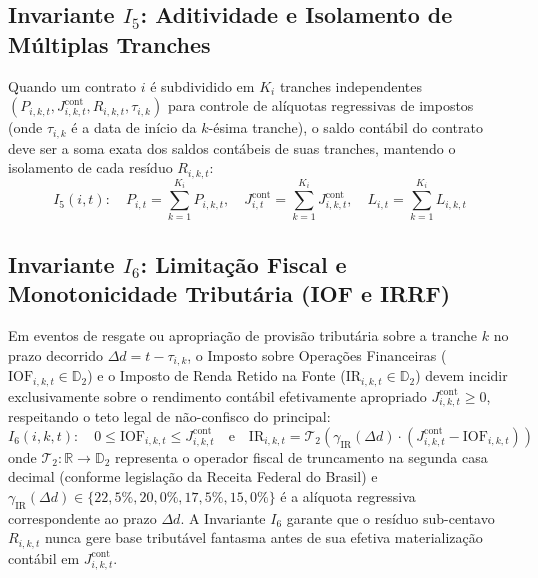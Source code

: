 \documentclass[11pt, a4paper]{article}
\begin{document}
\subsection{Invariante $I_5$: Aditividade e Isolamento de Múltiplas Tranches}

Quando um contrato $i$ é subdividido em $K_i$ tranches independentes $(P_{i,k,t}, J_{i,k,t}^{\text{cont}}, R_{i,k,t}, \tau_{i,k})$ para controle de alíquotas regressivas de impostos (onde $\tau_{i,k}$ é a data de início da $k$-ésima tranche), o saldo contábil do contrato deve ser a soma exata dos saldos contábeis de suas tranches, mantendo o isolamento de cada resíduo $R_{i,k,t}$:
\begin{equation}
    I_5(i, t): \quad P_{i,t} = \sum_{k=1}^{K_i} P_{i,k,t}, \quad J_{i,t}^{\text{cont}} = \sum_{k=1}^{K_i} J_{i,k,t}^{\text{cont}}, \quad L_{i,t} = \sum_{k=1}^{K_i} L_{i,k,t}
\end{equation}

\subsection{Invariante $I_6$: Limitação Fiscal e Monotonicidade Tributária (IOF e IRRF)}

Em eventos de resgate ou apropriação de provisão tributária sobre a tranche $k$ no prazo decorrido $\Delta d = t - \tau_{i,k}$, o Imposto sobre Operações Financeiras ($\text{IOF}_{i,k,t} \in \mathbb{D}_2$) e o Imposto de Renda Retido na Fonte ($\text{IR}_{i,k,t} \in \mathbb{D}_2$) devem incidir exclusivamente sobre o rendimento contábil efetivamente apropriado $J_{i,k,t}^{\text{cont}} \ge 0$, respeitando o teto legal de não-confisco do principal:
\begin{equation}
    I_6(i, k, t): \quad 0 \le \text{IOF}_{i,k,t} \le J_{i,k,t}^{\text{cont}} \quad \text{e} \quad \text{IR}_{i,k,t} = \mathcal{T}_2\left( \gamma_{\text{IR}}(\Delta d) \cdot \left( J_{i,k,t}^{\text{cont}} - \text{IOF}_{i,k,t} \right) \right)
\end{equation}
onde $\mathcal{T}_2 : \mathbb{R} \to \mathbb{D}_2$ representa o operador fiscal de truncamento na segunda casa decimal (conforme legislação da Receita Federal do Brasil) e $\gamma_{\text{IR}}(\Delta d) \in \{22{,}5\%, 20{,}0\%, 17{,}5\%, 15{,}0\%\}$ é a alíquota regressiva correspondente ao prazo $\Delta d$. A Invariante $I_6$ garante que o resíduo sub-centavo $R_{i,k,t}$ nunca gere base tributável fantasma antes de sua efetiva materialização contábil em $J_{i,k,t}^{\text{cont}}$.
\end{document}
